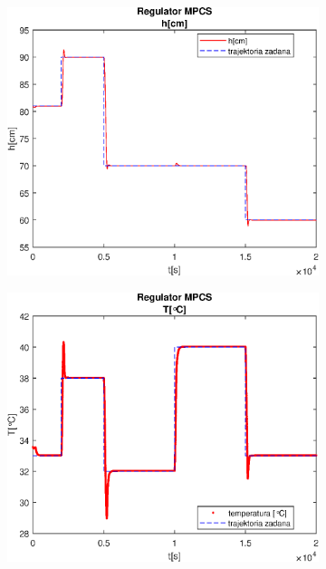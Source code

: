\begin{figure}[h!]
   \centering
   \begin{subfigure}[b]{0.4\textwidth}
      \includegraphics[width=1\linewidth]{img/MPCSanaLin/MPCSLinHN500Nu60l40.eps}
      \caption{}
      \label{fig:fig:MPCSLinN500Nu60l401}
   \end{subfigure}
       
   \begin{subfigure}[b]{0.4\textwidth}
      \includegraphics[width=1\linewidth]{img/MPCSanaLin/MPCSLinTN500Nu60l40.eps}
      \caption{}
      \label{fig:fig:MPCSLinN500Nu60l402}
   \end{subfigure}
       

\end{figure}

